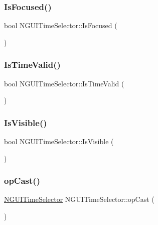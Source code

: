 \subsubsection{\texorpdfstring{Is\+Focused()}{IsFocused()}}
{\footnotesize\ttfamily bool N\+G\+U\+I\+Time\+Selector\+::\+Is\+Focused (\begin{DoxyParamCaption}{ }\end{DoxyParamCaption})}

\hypertarget{class_n_g_u_i_time_selector_ad5f53a4b684f8416c418af42bbe99ada}{}\label{class_n_g_u_i_time_selector_ad5f53a4b684f8416c418af42bbe99ada} 
\subsubsection{\texorpdfstring{Is\+Time\+Valid()}{IsTimeValid()}}
{\footnotesize\ttfamily bool N\+G\+U\+I\+Time\+Selector\+::\+Is\+Time\+Valid (\begin{DoxyParamCaption}{ }\end{DoxyParamCaption})}

\hypertarget{class_n_g_u_i_time_selector_a931125ecad002d634b04ddd7d0c18e49}{}\label{class_n_g_u_i_time_selector_a931125ecad002d634b04ddd7d0c18e49} 
\subsubsection{\texorpdfstring{Is\+Visible()}{IsVisible()}}
{\footnotesize\ttfamily bool N\+G\+U\+I\+Time\+Selector\+::\+Is\+Visible (\begin{DoxyParamCaption}{ }\end{DoxyParamCaption})}

\hypertarget{class_n_g_u_i_time_selector_a88de1afccf93160d5d788d4036ab7818}{}\label{class_n_g_u_i_time_selector_a88de1afccf93160d5d788d4036ab7818} 
\subsubsection{\texorpdfstring{op\+Cast()}{opCast()}}
{\footnotesize\ttfamily \hyperlink{class_n_g_u_i_time_selector}{N\+G\+U\+I\+Time\+Selector} N\+G\+U\+I\+Time\+Selector\+::op\+Cast (\begin{DoxyParamCaption}{ }\end{DoxyParamCaption})}

